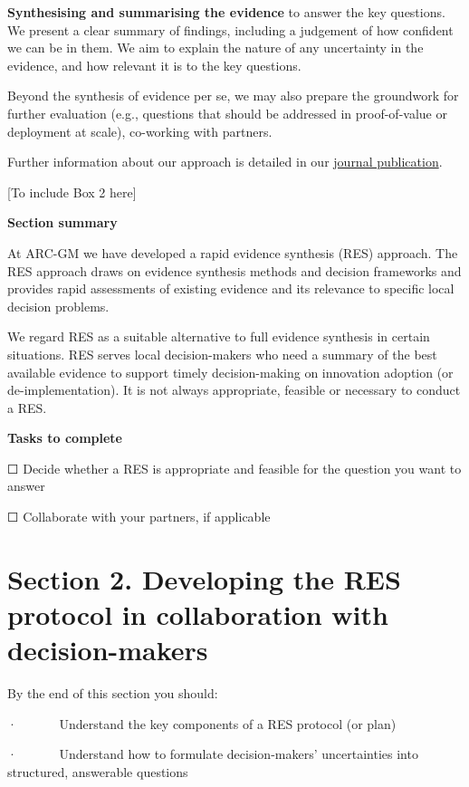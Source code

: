 \documentclass[
  letterpaper,
  DIV=11,
  numbers=noendperiod]{scrreprt}
\begin{document}
\textbf{Synthesising and summarising the evidence} to answer the key
questions. We present a clear summary of findings, including a judgement
of how confident we can be in them. We aim to explain the nature of any
uncertainty in the evidence, and how relevant it is to the key
questions.

Beyond the synthesis of evidence per se, we may also prepare the
groundwork for further evaluation (e.g., questions that should be
addressed in proof-of-value or deployment at scale), co-working with
partners.

Further information about our approach is detailed in our
\href{https://systematicreviewsjournal.biomedcentral.com/articles/10.1186/s13643-022-02106-z}{journal
publication}.

{[}To include Box 2 here{]}

\textbf{Section summary}

At ARC-GM we have developed a rapid evidence synthesis (RES) approach.
The RES approach draws on evidence synthesis methods and decision
frameworks and provides rapid assessments of existing evidence and its
relevance to specific local decision problems.

We regard RES as a suitable alternative to full evidence synthesis in
certain situations. RES serves local decision-makers who need a summary
of the best available evidence to support timely decision-making on
innovation adoption (or de-implementation). It is not always
appropriate, feasible or necessary to conduct a RES.

\textbf{Tasks to complete}

☐ Decide whether a RES is appropriate and feasible for the question you
want to answer

☐ Collaborate with your partners, if applicable


\chapter{Section 2. Developing the RES protocol in collaboration with
decision-makers}\label{section-2.-developing-the-res-protocol-in-collaboration-with-decision-makers}

By the end of this section you should:

·~~~~~~ Understand the key components of a RES protocol (or plan)

·~~~~~~ Understand how to formulate decision-makers' uncertainties into
structured, answerable questions
\end{document}
